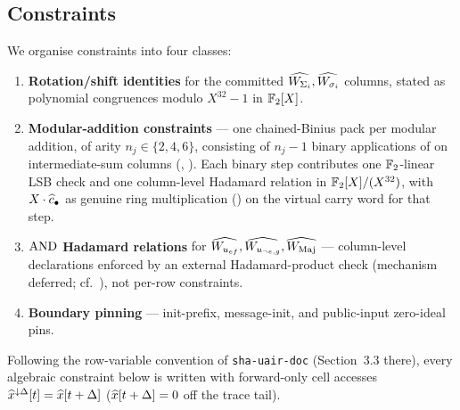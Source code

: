 \subsection{Constraints}\label{sec:constraints}

We organise constraints into four classes:

\begin{enumerate}[label=(\Alph*)]
  \item \textbf{Rotation/shift identities} for the committed
        $\widehat{W_{\Sigma_i}}, \widehat{W_{\sigma_i}}$ columns, stated as
        polynomial congruences modulo $X^{32}-1$ in $\mathbb{F}_2[X]$.
  \item \textbf{Modular-addition constraints} — one chained-Binius
        pack per modular addition, of arity $n_j \in \{2, 4, 6\}$,
        consisting of $n_j - 1$ binary applications of
         on intermediate-sum columns
        (, ). Each binary step
        contributes one $\mathbb{F}_2$-linear LSB check and one column-level
        Hadamard relation in $\mathbb{F}_2[X]/(X^{32})$, with $X\cdot\widehat{c}_\bullet$ as
        genuine ring multiplication () on the
        virtual carry word for that step.
  \item \textbf{$\operatorname{AND}$ Hadamard relations} for $\widehat{W_{u_{ef}}},
        \widehat{W_{u_{\neg e,g}}}, \widehat{W_{\operatorname{Maj}}}$ — column-level
        declarations enforced by an external Hadamard-product check
        (mechanism deferred; cf.\ ), not
        per-row constraints.
  \item \textbf{Boundary pinning} — init-prefix, message-init, and
        public-input zero-ideal pins.
\end{enumerate}

Following the row-variable convention of
\texttt{sha-uair-doc} (Section~3.3 there), every algebraic
constraint below is written with forward-only cell accesses
$\widehat{x}^{\downarrow\Delta}[t] = \widehat{x}[t+\Delta]$
($\widehat{x}[t+\Delta] = 0$ off the trace tail).


